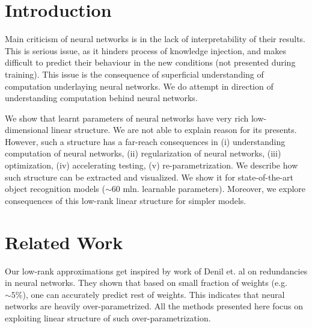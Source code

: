 \documentclass{article}
\begin{document}
 




\begin{abstract}

\end{abstract}

\section{Introduction}
Main criticism of neural networks is in the lack of interpretability of their results. This is serious issue,
as it hinders process of knowledge injection, and makes difficult to predict their behaviour in the new conditions (not
presented during training). This issue is the consequence of superficial understanding of computation 
underlaying neural networks. We do attempt in direction of understanding computation behind neural networks.


We show that learnt parameters of neural networks have very
rich low-dimensional linear structure. We are not able to explain reason for its presents. However, 
such a structure has a far-reach consequences in (i) understanding computation of neural networks, 
(ii) regularization of neural networks, (iii) optimization, (iv) accelerating testing, (v) re-parametrization.
We describe how such structure can be extracted and visualized. We show it for state-of-the-art object recognition models ($\sim60$ mln. 
learnable parameters). Moreover, we explore consequences of this low-rank linear structure for simpler models. 


\section{Related Work}


Our low-rank approximations get inspired by work of Denil et. al \cite{denil2013predicting} on redundancies in neural 
networks. They shown that based on small fraction of weights (e.g. $\sim 5\%$), one can accurately 
predict rest of weights. This indicates that neural networks are heavily over-parametrized.
All the methods presented here focus on exploiting linear structure of such over-parametrization.
\end{document}
